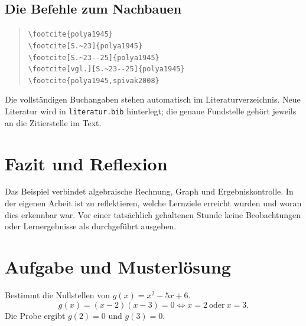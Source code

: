 \documentclass[12pt,a4paper,ngerman]{scrartcl}
\theoremstyle{definition}
\newcommand{\personA}{Vorname Nachname 1}
\newcommand{\personB}{Vorname Nachname 2}
\begin{document}
\subsection{Die Befehle zum Nachbauen}
\begin{quote}
\small
\verb|\footcite{polya1945}|\\
\verb|\footcite[S.~23]{polya1945}|\\
\verb|\footcite[S.~23--25]{polya1945}|\\
\verb|\footcite[vgl.][S.~23--25]{polya1945}|\\
\verb|\footcite{polya1945,spivak2008}|
\end{quote}
Die vollständigen Buchangaben stehen automatisch im Literaturverzeichnis.
Neue Literatur wird in \texttt{literatur.bib} hinterlegt; die genaue Fundstelle
gehört jeweils an die Zitierstelle im Text.

\section{Fazit und Reflexion}
Das Beispiel verbindet algebraische Rechnung, Graph und Ergebniskontrolle.
In der eigenen Arbeit ist zu reflektieren, welche Lernziele erreicht wurden
und woran dies erkennbar war. Vor einer tatsächlich gehaltenen Stunde keine
Beobachtungen oder Lernergebnisse als durchgeführt ausgeben.

\clearpage
{}



\clearpage
\appendix
\section{Aufgabe und Musterlösung}
\label{sec:anhang}
Bestimmt die Nullstellen von \(g(x)=x^2-5x+6\).
\[
  g(x)=(x-2)(x-3)=0 \iff x=2\ \text{oder}\ x=3.
\]
Die Probe ergibt \(g(2)=0\) und \(g(3)=0\).

\end{document}
